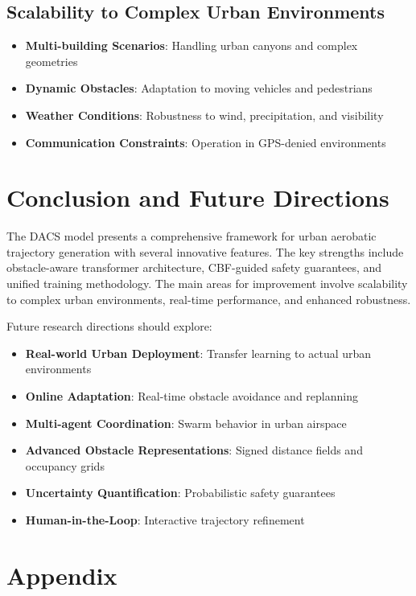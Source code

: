 \documentclass[12pt]{article}
\begin{document}
\subsection{Scalability to Complex Urban Environments}

\begin{itemize}
    \item \textbf{Multi-building Scenarios}: Handling urban canyons and complex geometries
    \item \textbf{Dynamic Obstacles}: Adaptation to moving vehicles and pedestrians
    \item \textbf{Weather Conditions}: Robustness to wind, precipitation, and visibility
    \item \textbf{Communication Constraints}: Operation in GPS-denied environments
\end{itemize}

\section{Conclusion and Future Directions}

The DACS model presents a comprehensive framework for urban aerobatic trajectory generation with several innovative features. The key strengths include obstacle-aware transformer architecture, CBF-guided safety guarantees, and unified training methodology. The main areas for improvement involve scalability to complex urban environments, real-time performance, and enhanced robustness.

Future research directions should explore:

\begin{itemize}
    \item \textbf{Real-world Urban Deployment}: Transfer learning to actual urban environments
    \item \textbf{Online Adaptation}: Real-time obstacle avoidance and replanning
    \item \textbf{Multi-agent Coordination}: Swarm behavior in urban airspace
    \item \textbf{Advanced Obstacle Representations}: Signed distance fields and occupancy grids
    \item \textbf{Uncertainty Quantification}: Probabilistic safety guarantees
    \item \textbf{Human-in-the-Loop}: Interactive trajectory refinement
\end{itemize}

\section*{Appendix}
\end{document}
